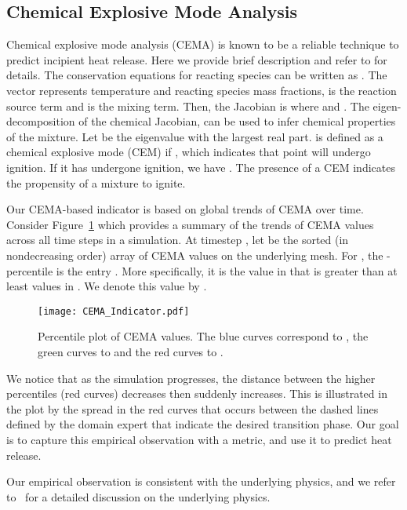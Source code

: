 \documentclass{sig-alternate}
\begin{document}
\subsection{Chemical Explosive Mode Analysis}
\label{sec:intution}
Chemical explosive mode analysis (CEMA) is known to be a reliable technique to predict incipient heat release. 
Here  we  provide brief description and refer to  \cite{lu,shan} for details. 
The conservation equations for reacting species can be written as .
\noindent The vector  represents temperature and reacting
species mass fractions,  is the reaction source term and
 is the mixing term. Then, the Jacobian is   where
 and
. 
The eigen-decomposition of the chemical Jacobian,  can be used to infer
chemical properties of the mixture.  
 Let  be the eigenvalue with the largest real part. 
 is defined as a chemical explosive mode (CEM) if 
, which indicates that point will undergo ignition. If it has undergone ignition, we
have .   The presence of a CEM indicates the propensity of a mixture to ignite.

Our CEMA-based indicator is based on global trends of CEMA over time.
Consider Figure~\ref{fig:CEMA_indicator} which provides a summary of the trends of CEMA
values across all time steps in a simulation. At timestep , let  be
the sorted (in nondecreasing order) array of CEMA values on the underlying mesh. 
For , the -percentile is the entry
. More specifically, it is the
value in  that is greater than at least 
values in . We denote this value by .

\begin{figure}[ht]
\centering
\texttt{[image: CEMA\_Indicator.pdf]}
\caption{\label{fig:CEMA_indicator} Percentile plot of CEMA values. 
The blue curves correspond to , the green curves to  and the red
curves to . }
\end{figure}


We notice that as the simulation progresses, the distance between the higher
percentiles (red curves) decreases then suddenly increases. This is illustrated
in the plot by the spread in the red curves that occurs between the dashed
lines defined by the domain expert that indicate the desired transition phase.  Our goal is to capture this empirical observation with a metric,  and use it to predict  heat release.
 
Our empirical observation is consistent with the underlying physics, and we refer to~\cite{cema-insitu} for a detailed discussion on  the underlying physics. 
\end{document}
